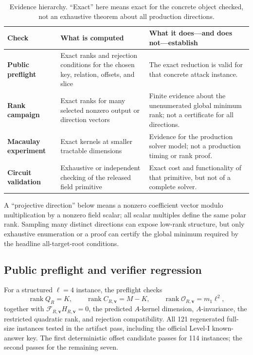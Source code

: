 \documentclass[11pt]{article}
\newcommand{\rank}{\operatorname{rank}}
\begin{document}
\begin{table}[H]
\centering
\caption{Evidence hierarchy.  ``Exact'' here means exact for the concrete
object checked, not an exhaustive theorem about all production directions.}
\label{tab:evidence-hierarchy}
\small
\renewcommand{\arraystretch}{1.12}
\begin{tabularx}{0.96\textwidth}{@{}>{\raggedright\arraybackslash\bfseries}p{}>{\raggedright\arraybackslash}p{}>{\raggedright\arraybackslash}X@{}}
\toprule
Check & What is computed & What it does---and does not---establish\\
\midrule
Public preflight & Exact ranks and rejection conditions for the chosen key,
relation, offsets, and slice & The exact reduction is valid for that concrete
attack instance.\\
Rank campaign & Exact ranks for many selected nonzero output or direction
vectors & Finite evidence about the unenumerated global minimum rank; not a
certificate for all directions.\\
Macaulay experiment & Exact kernels at smaller tractable dimensions & Evidence
for the production solver model; not a production timing or rank proof.\\
Circuit validation & Exhaustive or independent checking of the released field
primitive & Exact cost and functionality of that primitive, but not of a
complete solver.\\
\bottomrule
\end{tabularx}
\end{table}

A ``projective direction'' below means a nonzero coefficient vector modulo
multiplication by a nonzero field scalar; all scalar multiples define the same
polar rank.  Sampling many distinct directions can expose low-rank structure,
but only exhaustive enumeration or a proof can certify the global minimum
required by the headline all-target-root conditions.

\subsection{Public preflight and verifier regression}

For a structured $\ell=4$ instance, the preflight checks
\[
 \rank Q_R=K,\qquad \rank C_{R,\mathbf v}=M-K,\qquad
 \rank\mathcal O_{R,\mathbf v}=m_1\ell^2,
\]
together with $\mathcal F_{R,\mathbf v}H_{R,\mathbf v}=0$, the predicted $A$-kernel
dimension, $A$-invariance, the restricted quadratic rank, and rejection
compatibility.  All 121 regenerated full-size instances tested in the artifact pass,
including the official Level-I known-answer key.  The first deterministic
offset candidate passes for 114 instances; the second passes for the remaining
seven.
\end{document}
